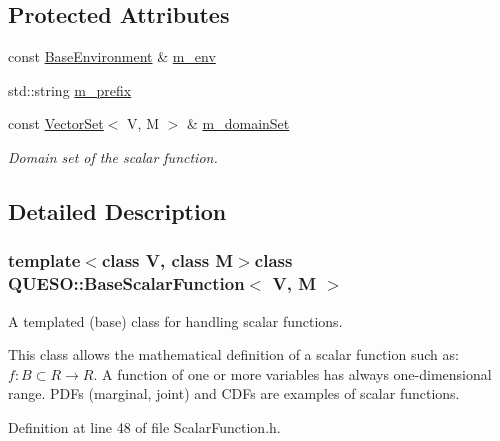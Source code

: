 \subsection*{Protected Attributes}
\begin{DoxyCompactItemize}
\item 
const \hyperlink{class_q_u_e_s_o_1_1_base_environment}{Base\-Environment} \& \hyperlink{class_q_u_e_s_o_1_1_base_scalar_function_adf44141aeb765d97613286f88f235f04}{m\-\_\-env}
\item 
std\-::string \hyperlink{class_q_u_e_s_o_1_1_base_scalar_function_a6e81dc902aca6a546877da99b2f4a169}{m\-\_\-prefix}
\item 
const \hyperlink{class_q_u_e_s_o_1_1_vector_set}{Vector\-Set}$<$ V, M $>$ \& \hyperlink{class_q_u_e_s_o_1_1_base_scalar_function_a67696e86211197938c72cd11863f5cf8}{m\-\_\-domain\-Set}
\begin{DoxyCompactList}\small\item\em Domain set of the scalar function. \end{DoxyCompactList}\end{DoxyCompactItemize}


\subsection{Detailed Description}
\subsubsection*{template$<$class V, class M$>$class Q\-U\-E\-S\-O\-::\-Base\-Scalar\-Function$<$ V, M $>$}

A templated (base) class for handling scalar functions. 

This class allows the mathematical definition of a scalar function such as\-: $ f: B \subset R \rightarrow R $. A function of one or more variables has always one-\/dimensional range. P\-D\-Fs (marginal, joint) and C\-D\-Fs are examples of scalar functions. 

Definition at line 48 of file Scalar\-Function.\-h.




